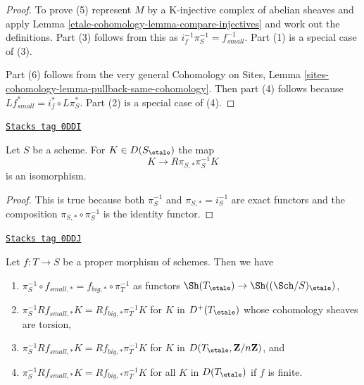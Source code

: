 \begin{proof}
To prove (5) represent $M$ by a K-injective complex of abelian sheaves
and apply Lemma \ref{etale-cohomology-lemma-compare-injectives}
and work out the definitions. Part (3) follows from
this as $i_f^{-1}\pi_S^{-1} = f_{small}^{-1}$. Part (1) is a special
case of (3).

\medskip\noindent
Part (6) follows from the very general Cohomology on Sites, Lemma
\ref{sites-cohomology-lemma-pullback-same-cohomology}. Then part
(4) follows because $Lf_{small}^* = i_f^* \circ L\pi_S^*$.
Part (2) is a special case of (4).
\end{proof}

\begin{lemma}
\label{etale-cohomology-lemma-cohomological-descent-etale}
\href{https://stacks.math.columbia.edu/tag/0DDI}{\texttt{Stacks tag 0DDI}}

Let $S$ be a scheme. For $K \in D(S_\etale)$ the map
$$
K \longrightarrow R\pi_{S, *}\pi_S^{-1}K
$$
is an isomorphism.
\end{lemma}

\begin{proof}
This is true because both $\pi_S^{-1}$ and $\pi_{S, *} = i_S^{-1}$
are exact functors and the composition $\pi_{S, *} \circ \pi_S^{-1}$
is the identity functor.
\end{proof}

\begin{lemma}
\label{etale-cohomology-lemma-compare-higher-direct-image-proper}
\href{https://stacks.math.columbia.edu/tag/0DDJ}{\texttt{Stacks tag 0DDJ}}

Let $f : T \to S$ be a proper morphism of schemes. Then we have
\begin{enumerate}
\item $\pi_S^{-1} \circ f_{small, *} = f_{big, *} \circ \pi_T^{-1}$
as functors $\Sh(T_\etale) \to \Sh((\Sch/S)_\etale)$,
\item $\pi_S^{-1}Rf_{small, *}K = Rf_{big, *}\pi_T^{-1}K$
for $K$ in $D^+(T_\etale)$ whose cohomology sheaves are torsion,
\item $\pi_S^{-1}Rf_{small, *}K = Rf_{big, *}\pi_T^{-1}K$
for $K$ in $D(T_\etale, \mathbf{Z}/n\mathbf{Z})$, and
\item $\pi_S^{-1}Rf_{small, *}K = Rf_{big, *}\pi_T^{-1}K$
for all $K$ in $D(T_\etale)$ if $f$ is finite.
\end{enumerate}
\end{lemma}

